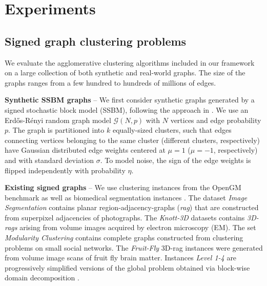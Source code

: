 
\section{Experiments}\label{sec:neuro_segm_exp}
\subsection{Signed graph clustering problems}
We evaluate the agglomerative clustering algorithms included in our framework on a large collection of both synthetic and real-world graphs. The size of the graphs ranges from a few hundred to hundreds of millions of edges.

\textbf{Synthetic SSBM graphs} -- We first consider synthetic graphs generated by a signed stochastic block model (SSBM), following the approach in \cite{Cucuringu2019SPONGEAG}. We use an Erd\H os-R\'enyi random graph model $\mathcal{G}(N,p)$ with $N$ vertices and edge probability $p$. The graph is partitioned into $k$ equally-sized clusters, such that edges connecting vertices belonging to the same cluster (different clusters, respectively) have Gaussian distributed edge weights centered at $\mu=1$ ($\mu=-1$, respectively) and with standard deviation $\sigma$. To model noise, the sign of the edge weights is flipped independently with probability $\eta$.


\textbf{Existing signed graphs}  -- We use clustering instances from the OpenGM benchmark \cite{kappes2013comparative} as well as biomedical segmentation instances \cite{pape2017solving}. The dataset \emph{Image Segmentation} contains planar region-adjacency-graphs (\emph{rag}) that are constructed from superpixel adjacencies of photographs. The \emph{Knott-3D} datasets contains \emph{3D-rags} arising from volume images acquired by electron microscopy (EM). The set \emph{Modularity Clustering} contains complete graphs constructed from clustering problems on small social networks. The \emph{Fruit-Fly} 3D-rag instances were generated from volume image scans of fruit fly brain matter. Instances \emph{Level 1-4} are progressively simplified versions of the global problem obtained via block-wise domain decomposition \cite{pape2017solving}.

